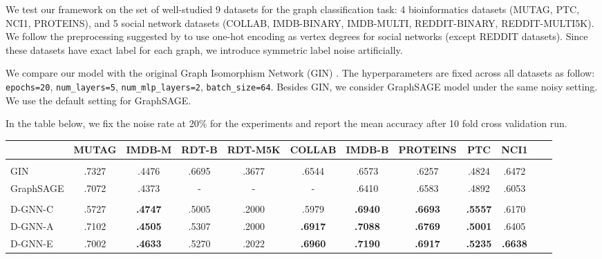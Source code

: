 \documentclass[portrait,final,a0paper,fontscale=0.365]{baposter}
\begin{document}
\begin{poster}
{\begin{multicols}{2}
\columnbreak

\vspace*{0.5em}
\noindent
We test our framework on the set of well-studied 9 datasets for the graph 
classification task: 4 bioinformatics datasets (MUTAG, PTC, NCI1, PROTEINS),
and 5 social network datasets (COLLAB, IMDB-BINARY, IMDB-MULTI, REDDIT-BINARY, REDDIT-MULTI5K). We follow the preprocessing suggested by \cite{xu2018how} 
to use one-hot encoding as vertex degrees for social networks (except REDDIT datasets). Since these datasets have exact 
label for each graph, we introduce symmetric label noise artificially.
\end{multicols}

\noindent
We compare our model with the original Graph Isomorphism Network (GIN) \cite{xu2018how}.
The hyperparameters are fixed across all datasets as follow: \texttt{epochs=20}, 
\texttt{num\_layers=5}, \texttt{num\_mlp\_layers=2}, \texttt{batch\_size=64}.
Besides GIN, we consider GraphSAGE model \cite{hamilton2017inductive} under the same noisy setting. We use the default setting for GraphSAGE.


\vspace{1em}
\noindent
In the table below, we fix the noise rate at 20\% for the experiments and report the mean accuracy after 10 fold cross validation run.  

\vspace{1em}

\hspace{-1em}
  \begin{tabular}{lccccccccccc}
                                 & MUTAG   & IMDB-M    & RDT-B   & RDT-M5K & COLLAB    & IMDB-B   & PROTEINS    & PTC         & NCI1 \\
    \hline \\
    GIN                          & .7327   & .4476     & .6695   & .3677   & .6544     & .6573    & .6257       & .4824       & .6472 \\
    GraphSAGE                    & .7072   & .4373     &   -     & -       & -         & .6410    & .6583       & .4892       & .6053 
    \vspace{0.5em}\\
    \hline \vspace{-0.5em} \\
    D-GNN-C                      &  .5727  &  \bf.4747 & .5005   & .2000   &  .5979    & \bf.6940 & \bf.6693    & \bf.5557       &  .6170 \\
    D-GNN-A                      &  .7102  &  \bf.4505 & .5307   & .2000   &  \bf.6917 & \bf.7088 & \bf.6769    & \bf.5001       & .6405  \\
    D-GNN-E                      &  .7002  &  \bf.4633 & .5270   & .2022   &  \bf.6960 & \bf.7190 & \bf.6917    & \bf.5235       & \bf.6638 \\
  \end{tabular}

}
\end{poster}
\end{document}
